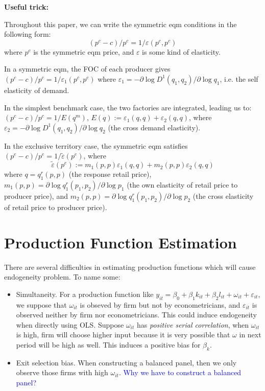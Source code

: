 \documentclass{book}
\theoremstyle{plain}
\theoremstyle{definition}
\begin{document}
\begin{mdframed}[style=comment]

\noindent
\textbf{Useful trick:}

Throughout this paper, we can write the symmetric eqm conditions in the following form:
\[(p^c - c)/p^c=1/\varepsilon(p^c,p^c)\]
where $p^c$ is the symmetric eqm price, and $\varepsilon$ is some kind of elasticity.

In a symmetric eqm, the FOC of each producer gives 
\((p^c - c)/p^c=1/\varepsilon_1(p^c,p^c)\)
where $\varepsilon_1 = -\partial \log D^1(q_1,q_2)/\partial \log q_1$, i.e. the self elasticity of demand.

In the simplest benchmark case, the two factories are integrated, leading us to:
\((p^c - c)/p^c=1/E(q^m)\),
$E(q):=\varepsilon_1(q,q)+\varepsilon_2(q,q)$, where $\varepsilon_2 = -\partial \log D^1(q_1,q_2)/\partial \log q_2$ (the cross demand elasticity).

In the exclusive territory case, the symmetric eqm satisfies \((p^e - c)/p^e=1/\tilde\varepsilon(p^e)\), where 
\[\tilde\varepsilon(p^e):=m_1(p,p)\varepsilon_1(q,q)+m_2(p,p)\varepsilon_2(q,q) \]
where $q=q_1^r(p,p)$ (the response retail price),
$m_1(p,p)=\partial \log q_1^r(p_1,p_2)/\partial \log p_1$ (the own elasticity of retail price to producer price),
and  $m_2(p,p)=\partial \log q_1^r(p_1,p_2)/\partial \log p_2$ (the cross elasticity of retail price to producer price).

\end{mdframed}







\section{Production Function Estimation} %
\label{sec:production_function_estimation}

There are several difficulties in estimating production functions which will cause endogeneity problem. To name some:
\begin{itemize}
	\item Simultaneity. For a production function like $y_{it}=\beta_0+\beta_1 k_{it}+\beta_2 l_{it} + \omega_{it}+\varepsilon_{it}$, we suppose that $\omega_{it}$ is obseved by firm but not by econometricians, and $\varepsilon_{it}$ is observed neither by firm nor econometricians. This could induce endogeneity when directly using OLS. 
	Suppose $\omega_{it}$ has \textit{positive serial correlation}, when $\omega_{it}$ is high, firm will choose higher input because it is very possible that $\omega$ in next period will be high as well. This induces a positive bias for $\beta_k$.
	\item Exit selection bias. When constructing a balanced panel, then we only observe those firms with high $\omega_{it}$.
	\textcolor{blue}{Why we have to construct a balanced panel?}
\end{itemize}
\end{document}
